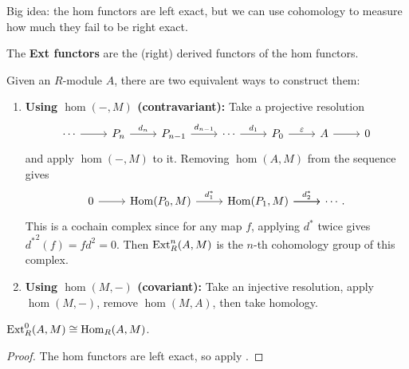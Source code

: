 \documentclass[twoside,10pt]{report}
\begin{document}
\begin{note}[]
Big idea: the hom functors are left exact, but we can use cohomology to measure how much they fail to be right exact.
\end{note}

\begin{defn}[]
	The \textbf{Ext functors} are the (right) derived functors of the hom functors.
\end{defn}

Given an $R$-module $A$, there are two equivalent ways to construct them:
\begin{enumerate}
	\item \textbf{Using $\hom(-,M)$ (contravariant):} Take a projective resolution
\[
\begin{tikzcd}
	\cdots \rar & P_{n}\rar{d_{n}} & P_{n-1}\rar{d_{n-1}} & \cdots \rar{d_1} & P_0 \rar{\varepsilon} & A \rar & 0
\end{tikzcd}
\] 
and apply $\hom(-,M)$ to it. Removing $\hom(A,M)$ from the sequence gives
\[
	\begin{tikzcd}
		0 \rar & \hom(P_0,M) \rar{d_1^{*}} & \hom(P_1,M)\rar{d_2^{*}} \rar & \cdots.
	\end{tikzcd}
\] 
This is a cochain complex since for any map $f$, applying $d^{*}$ twice gives ${d^{*}}^2(f) = fd^2=0$. Then $\operatorname{\text{Ext}}_{R}^{n}(A,M)$ is the $n$-th cohomology group of this complex.

	\item \textbf{Using $\hom(M,-)$ (covariant):} Take an injective resolution, apply $\hom(M,-)$, remove $\hom(M,A)$, then take homology. 
\end{enumerate}

\begin{prop}
	$\operatorname{\text{Ext}}_{R}^{0}(A,M)\cong \operatorname{Hom}_{R}(A,M)$.
\end{prop}
\begin{proof}
	The hom functors are left exact, so apply .
\end{proof}

\end{document}
